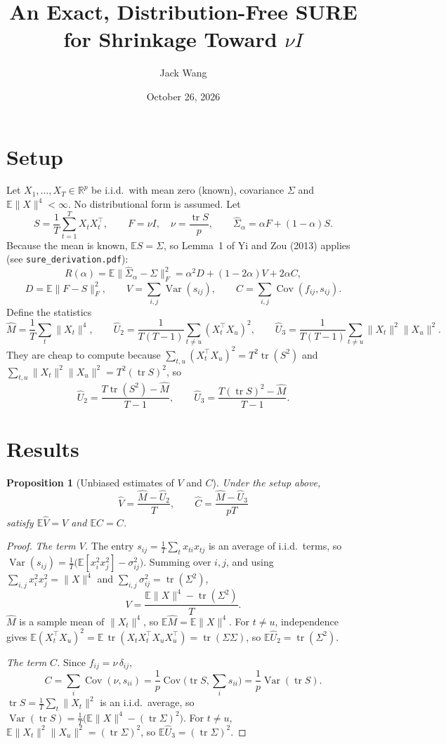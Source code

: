 \documentclass[11pt]{article}
\title{An Exact, Distribution-Free SURE for Shrinkage Toward $\nu I$}
\author{Jack Wang}
\date{October 26, 2026}
\newtheorem{proposition}{Proposition}
\theoremstyle{remark}\newtheorem*{remark}{Remark}
\newcommand{\E}{\mathbb{E}}
\newcommand{\Var}{\operatorname{Var}}
\newcommand{\Cov}{\operatorname{Cov}}
\newcommand{\tr}{\operatorname{tr}}
\begin{document}
\maketitle
\vspace{-2em}

\section{Setup}
Let $X_1,\dots,X_T\in\mathbb{R}^p$ be i.i.d.\ with mean zero (known), covariance $\Sigma$ and
$\E\|X\|^4<\infty$. No distributional form is assumed. Let
\[
S=\frac1T\sum_{t=1}^T X_tX_t^\top,\qquad F=\nu I,\quad \nu=\frac{\tr S}{p},\qquad
\hat\Sigma_\alpha=\alpha F+(1-\alpha)S .
\]
Because the mean is known, $\E S=\Sigma$, so Lemma~1 of Yi and Zou (2013) applies (see
\texttt{sure\_derivation.pdf}):
\begin{equation}\label{eq:risk}
R(\alpha)=\E\|\hat\Sigma_\alpha-\Sigma\|_F^2=\alpha^2 D+(1-2\alpha)V+2\alpha C,
\end{equation}
\[
D=\E\|F-S\|_F^2,\qquad V=\sum_{i,j}\Var(s_{ij}),\qquad C=\sum_{i,j}\Cov(f_{ij},s_{ij}).
\]
Define the statistics
\[
\hat M=\frac1T\sum_t\|X_t\|^4,\qquad
\hat U_2=\frac{1}{T(T-1)}\sum_{t\neq u}(X_t^\top X_u)^2,\qquad
\hat U_3=\frac{1}{T(T-1)}\sum_{t\neq u}\|X_t\|^2\|X_u\|^2 .
\]
They are cheap to compute because
$\sum_{t,u}(X_t^\top X_u)^2=T^2\tr(S^2)$ and $\sum_{t,u}\|X_t\|^2\|X_u\|^2=T^2(\tr S)^2$, so
\[
\hat U_2=\frac{T\tr(S^2)-\hat M}{T-1},\qquad \hat U_3=\frac{T(\tr S)^2-\hat M}{T-1}.
\]

\section{Results}

\begin{proposition}[Unbiased estimates of $V$ and $C$]\label{prop:unbiased}
Under the setup above,
\[
\hat V=\frac{\hat M-\hat U_2}{T},\qquad \hat C=\frac{\hat M-\hat U_3}{pT}
\]
satisfy $\E\hat V=V$ and $\E\hat C=C$.
\end{proposition}

\begin{proof}
\emph{The term $V$.} The entry $s_{ij}=\frac1T\sum_t x_{ti}x_{tj}$ is an average of i.i.d.\ terms, so
$\Var(s_{ij})=\frac1T\big(\E[x_i^2x_j^2]-\sigma_{ij}^2\big)$. Summing over $i,j$, and using
$\sum_{i,j}x_i^2x_j^2=\|X\|^4$ and $\sum_{i,j}\sigma_{ij}^2=\tr(\Sigma^2)$,
\[
V=\frac{\E\|X\|^4-\tr(\Sigma^2)}{T}.
\]
$\hat M$ is a sample mean of $\|X_t\|^4$, so $\E\hat M=\E\|X\|^4$. For $t\neq u$, independence gives
$\E(X_t^\top X_u)^2=\E\,\tr(X_tX_t^\top X_uX_u^\top)=\tr(\Sigma\Sigma)$, so $\E\hat U_2=\tr(\Sigma^2)$.

\emph{The term $C$.} Since $f_{ij}=\nu\,\delta_{ij}$,
\[
C=\sum_i\Cov(\nu,s_{ii})=\frac1p\Cov\Big(\tr S,\sum_i s_{ii}\Big)=\frac1p\Var(\tr S).
\]
$\tr S=\frac1T\sum_t\|X_t\|^2$ is an i.i.d.\ average, so
$\Var(\tr S)=\frac1T\big(\E\|X\|^4-(\tr\Sigma)^2\big)$. For $t\neq u$,
$\E\|X_t\|^2\|X_u\|^2=(\tr\Sigma)^2$, so $\E\hat U_3=(\tr\Sigma)^2$.
\end{proof}
\end{document}
